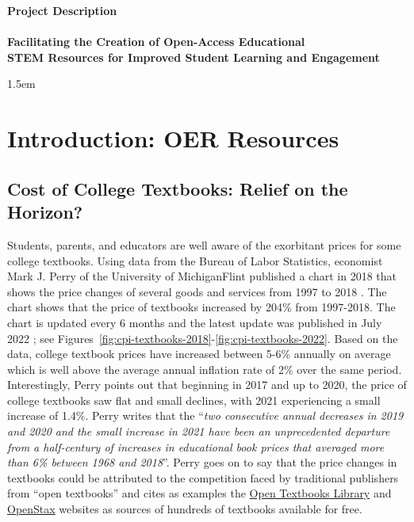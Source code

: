 \documentclass[11pt]{article}
\theoremstyle{theorem}
\theoremstyle{definition}
\begin{document}
\begin{center}
\textbf{\Large Project Description}\\[0.25cm]
\hrulefill\\[0.5cm]
\textbf{\Large Facilitating the Creation of Open-Access Educational \\[0.25cm] STEM Resources for Improved Student Learning and Engagement}\\
\hrulefill
\end{center}
\baselineskip 1.5em

\section{Introduction: OER Resources}


\subsection{Cost of College Textbooks: Relief on the Horizon?}
Students, parents, and educators are well aware of the exorbitant prices for some college textbooks.  Using data from the Bureau of Labor Statistics, economist Mark J. Perry of the University of Michigan\textendash Flint published a chart in 2018 that shows the price changes of several goods and services from 1997 to 2018 \cite{perry2018}.  The chart shows that the price of textbooks increased by 204\% from 1997-2018.  The chart is updated every 6 months and the latest update was published in July 2022 \cite{perry2022}; see Figures~\ref{fig:cpi-textbooks-2018}-\ref{fig:cpi-textbooks-2022}.  Based on the data, college textbook prices have increased between 5-6\% annually on average which is well above the average annual inflation rate of 2\% over the same period.  Interestingly, Perry points out that beginning in 2017 and up to 2020, the price of college textbooks saw flat and small declines, with 2021 experiencing a small increase of 1.4\%.  Perry writes that the ``\textit{two consecutive annual decreases in 2019 and 2020 and the small increase in 2021 have been an unprecedented departure from a half-century of increases in educational book prices that averaged more than 6\% between 1968 and 2018}''.  Perry goes on to say that the price changes in textbooks could be attributed to the competition faced by traditional publishers from ``open textbooks'' and cites as examples the \href{https://open.umn.edu/opentextbooks}{Open Textbooks Library} and \href{https://openstax.org/}{OpenStax} websites as sources of hundreds of textbooks available for free.
\end{document}
